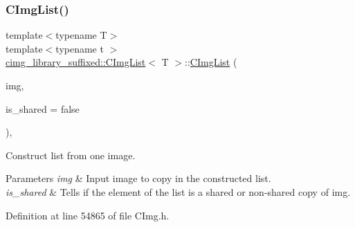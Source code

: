 \subsubsection{\texorpdfstring{C\+Img\+List()}{CImgList()}\hspace{0.1cm}{\footnotesize\ttfamily [8/19]}}
{\footnotesize\ttfamily template$<$typename T$>$ \\
template$<$typename t $>$ \\
\hyperlink{structcimg__library__suffixed_1_1CImgList}{cimg\+\_\+library\+\_\+suffixed\+::\+C\+Img\+List}$<$ T $>$\+::\hyperlink{structcimg__library__suffixed_1_1CImgList}{C\+Img\+List} (\begin{DoxyParamCaption}\item[{const \hyperlink{structcimg__library__suffixed_1_1CImg}{C\+Img}$<$ t $>$ \&}]{img,  }\item[{const bool}]{is\+\_\+shared = {\ttfamily false} }\end{DoxyParamCaption})\hspace{0.3cm}{\ttfamily [inline]}, {\ttfamily [explicit]}}



Construct list from one image. 


\begin{DoxyParams}{Parameters}
{\em img} & Input image to copy in the constructed list. \\
\hline
{\em is\+\_\+shared} & Tells if the element of the list is a shared or non-\/shared copy of {\ttfamily img}. \\
\hline
\end{DoxyParams}


Definition at line 54865 of file C\+Img.\+h.

\mbox{\label{structcimg__library__suffixed_1_1CImgList_a83b2d5b58d0614f7a091c9001cb81567}} 

